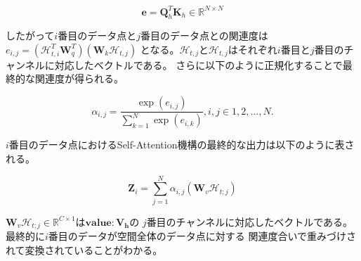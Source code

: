 \begin{equation}
\boldsymbol{e} = \boldsymbol{Q}_{h}^T\boldsymbol{K}_{h} \in \mathbb{R}^{N \times N}
\end{equation}

したがって$i$番目のデータ点と$j$番目のデータ点との関連度は$e_{i,j} = (\mathcal{H}_{t,i}^T\boldsymbol{W}_{q}^T)(\boldsymbol{W}_{k}\mathcal{H}_{t,j})$
となる。$\mathcal{H}_{t,j}$と$\mathcal{H}_{t,j}$はそれぞれ$i$番目と$j$番目のチャンネルに対応したベクトルである。
さらに以下のように正規化することで最終的な関連度が得られる。

\begin{equation}
\alpha_{i,j} = \frac{\exp(e_{i,j})}{\sum_{k=1}^{N}\exp(e_{i,k})}, i,j \in {1, 2, ..., N}.
\end{equation}

$i$番目のデータ点におけるSelf-Attention機構の最終的な出力は以下のように表される。

\begin{equation}
\boldsymbol{Z}_{i} = \sum_{j=1}^N\alpha_{i,j}(\boldsymbol{W}_{v}\mathcal{H}_{t;j})
\end{equation}

$\boldsymbol{W}_{v}\mathcal{H}_{t;j} \in \mathbb{R}^{C \times 1}$は$\boldsymbol{value: V_{h}}$の
$j$番目のチャンネルに対応したベクトルである。最終的に$i$番目のデータが空間全体のデータ点に対する
関連度合いで重みづけされて変換されていることがわかる。